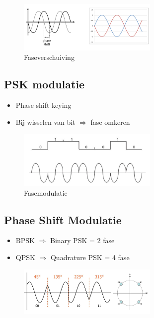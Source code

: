 \documentclass{article}
\begin{document}
\begin{figure}[H]
    \centering
    \includegraphics[width=0.6\textwidth]{Screenshot_20200302_121855.png}
    \caption{Faseverschuiving}
\end{figure}

\subsection{PSK modulatie}
\begin{itemize}
    \item Phase shift keying
    \item Bij wisselen van bit $\Rightarrow$ fase omkeren
\end{itemize}

\begin{figure}[H]
    \centering
    \includegraphics[width=0.6\textwidth]{Screenshot_20200302_122031.png}
    \caption{Fasemodulatie}
\end{figure}

\subsection{Phase Shift Modulatie}
\begin{itemize}
    \item BPSK $\Rightarrow$ Binary PSK = 2 fase
    \item QPSK $\Rightarrow$ Quadrature PSK = 4 fase
\end{itemize}

\begin{figure}[H]
    \centering
    \includegraphics[width=0.6\textwidth]{Screenshot_20200302_122452.png}
    \caption{}
\end{figure}
\end{document}
